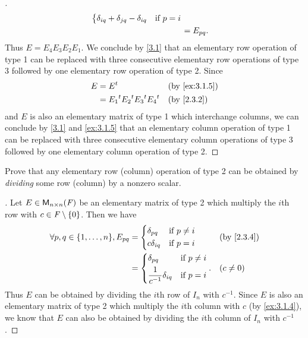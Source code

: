 \begin{proof}[]
\begin{align*}
\begin{dcases}
			     \delta_{i q} + \delta_{j q} - \delta_{i q} & \text{if } p = i
		     \end{dcases}                                                           \\
		 & = E_{p q}.
	\end{align*}
	Thus \(E = E_4 E_3 E_2 E_1\).
	We conclude by \cref{3.1} that an elementary row operation of type 1 can be replaced with three consecutive elementary row operations of type 3 followed by one elementary row operation of type 2.
	Since
	\begin{align*}
		E & = \tp{E}                              &  & \by{ex:3.1.5} \\
		  & = \tp{E_1} \tp{E_2} \tp{E_3} \tp{E_4} &  & \by{2.3.2}
	\end{align*}
	and \(E\) is also an elementary matrix of type 1 which interchange columns, we can conclude by \cref{3.1} and \cref{ex:3.1.5} that an elementary column operation of type 1 can be replaced with three consecutive elementary column operations of type 3 followed by one elementary column operation of type 2.
\end{proof}

\begin{ex}\label{ex:3.1.10}
	Prove that any elementary row (column) operation of type 2 can be obtained by \emph{dividing} some row (column) by a nonzero scalar.
\end{ex}

\begin{proof}[]
	Let \(E \in \mathsf{M}_{{n} \times n}({\mathit{F}})\) be an elementary matrix of type 2 which multiply the \(i\)th row with \(c \in \mathit{F} \setminus \left\lbrace0\right\rbrace\).
	Then we have
	\begin{align*}
		\forall p, q \in \set{1, \dots, n}, E_{p q} & = \begin{dcases}
			                                                \delta_{p q}   & \text{if } p \neq i \\
			                                                c \delta_{i q} & \text{if } p = i
		                                                \end{dcases}                                      &  & \by{2.3.4}           \\
		                                            & = \begin{dcases}
			                                                \delta_{p q}                  & \text{if } p \neq i \\
			                                                \frac{1}{c^{-1}} \delta_{i q} & \text{if } p = i
		                                                \end{dcases}. &  & (c \neq 0)
	\end{align*}
	Thus \(E\) can be obtained by dividing the \(i\)th row of \(I_n\) with \(c^{-1}\).
	Since \(E\) is also an elementary matrix of type 2 which multiply the \(i\)th column with \(c\) (by \cref{ex:3.1.4}), we know that \(E\) can also be obtained by dividing the \(i\)th column of \(I_n\) with \(c^{-1}\).
\end{proof}

